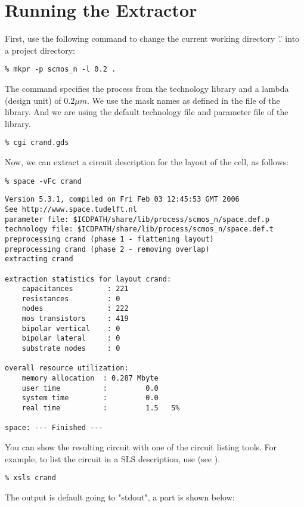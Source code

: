 \section{Running the Extractor}
First, use the following command to change the current working directory '.' into a project directory:
\small
\begin{Verbatim}
% mkpr -p scmos_n -l 0.2 .
\end{Verbatim}
\normalsize
The command specifies the  process from the technology library
and a lambda (design unit) of $0.2 \mu m$.
We use the mask names as defined in the  file of the library.
And we are using the default technology file 
and parameter file  of the library.
\small
\begin{Verbatim}
% cgi crand.gds
\end{Verbatim}
\normalsize
Now, we can extract a circuit description for the layout of the  cell, as follows:
\small
\begin{Verbatim}
% space -vFc crand
\end{Verbatim}
\normalsize
\small \begin{Verbatim}[frame=single]
Version 5.3.1, compiled on Fri Feb 03 12:45:53 GMT 2006
See http://www.space.tudelft.nl
parameter file: $ICDPATH/share/lib/process/scmos_n/space.def.p
technology file: $ICDPATH/share/lib/process/scmos_n/space.def.t
preprocessing crand (phase 1 - flattening layout)
preprocessing crand (phase 2 - removing overlap)
extracting crand

extraction statistics for layout crand:
	capacitances        : 221
	resistances         : 0
	nodes               : 222
	mos transistors     : 419
	bipolar vertical    : 0
	bipolar lateral     : 0
	substrate nodes     : 0

overall resource utilization:
	memory allocation  : 0.287 Mbyte
	user time          :         0.0
	system time        :         0.0
	real time          :         1.5   5%

space: --- Finished ---
\end{Verbatim}
\normalsize
You can show the resulting circuit with one of the circuit listing tools.
For example, to list the circuit in a SLS description, use  (see ).
\small
\begin{Verbatim}
% xsls crand
\end{Verbatim}
\normalsize
The output is default going to "stdout", a part is shown below:
